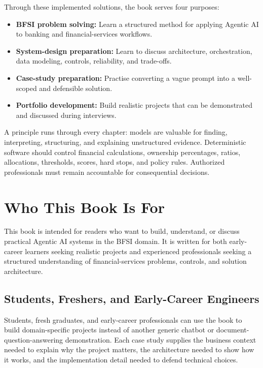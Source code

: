 Through these implemented solutions, the book serves four purposes:

\begin{itemize}
  \item \textbf{BFSI problem solving:} Learn a structured method for applying Agentic AI to banking and financial-services workflows.
  \item \textbf{System-design preparation:} Learn to discuss architecture, orchestration, data modeling, controls, reliability, and trade-offs.
  \item \textbf{Case-study preparation:} Practise converting a vague prompt into a well-scoped and defensible solution.
  \item \textbf{Portfolio development:} Build realistic projects that can be demonstrated and discussed during interviews.
\end{itemize}

A principle runs through every chapter: models are valuable for finding, interpreting, structuring, and explaining unstructured evidence. Deterministic software should control financial calculations, ownership percentages, ratios, allocations, thresholds, scores, hard stops, and policy rules. Authorized professionals must remain accountable for consequential decisions.

\newpage

\section*{Who This Book Is For}

This book is intended for readers who want to build, understand, or discuss practical Agentic AI systems in the BFSI domain. It is written for both early-career learners seeking realistic projects and experienced professionals seeking a structured understanding of financial-services problems, controls, and solution architecture.

\subsection*{Students, Freshers, and Early-Career Engineers}

Students, fresh graduates, and early-career professionals can use the book to build domain-specific projects instead of another generic chatbot or document-question-answering demonstration. Each case study supplies the business context needed to explain why the project matters, the architecture needed to show how it works, and the implementation detail needed to defend technical choices.

